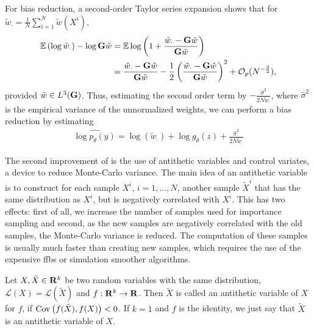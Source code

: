 For bias reduction, a second-order Taylor series expansion shows that for $\tilde{w}_\cdot = \frac{1}{N} \sum_{i =1}^N \tilde w(X^{i})$,
\begin{align*}
    \mathbb E \left(\log \tilde{w}_\cdot\right) - \log \mathbf G \tilde w &= \mathbb E \log \left(1 + \frac{\tilde{w}_\cdot - \mathbf G \tilde w}{\mathbf G \tilde w} \right)\\
                                                           &=  \frac{\tilde{w}_\cdot - \mathbf G \tilde w}{\mathbf G \tilde w}  - \frac{1}{2} \left(\frac{\tilde{w}_\cdot - \mathbf G \tilde w}{\mathbf G \tilde w} \right)^{2} + \mathcal O_{p}(N^{-\frac{3}{2}}),
\end{align*}
provided $\tilde w \in L^{3}(\mathbf G)$. Thus, estimating the second order term by $- \frac{\hat\sigma^2}{2N \tilde{w}_\cdot} $, where $\hat \sigma^{2}$ is the empirical variance of the unnormalized weights, we can perform a bias reduction by estimating 
\begin{align}
    \label{eq:loglik-hat-bias-reduction}
    \widehat{\log p_{\theta}(y)} = \log \left(\tilde w_{\cdot}\right) + \log g_{\theta}(z) + \frac{\hat\sigma^{2}}{2N\tilde w_{\cdot}}
\end{align}

The second improvement of \citep{Durbin1997Monte} is the use of antithetic variables and control variates, a device to reduce Monte-Carlo variance. The main idea of an antithetic variable is to construct for each sample $X^{i}$, $i = 1,\dots, N$, another sample $\tilde X^{i}$ that has the same distribution as $X^{i}$, but is negatively correlated with $X^{i}$. This has two effects: first of all, we increase the number of samples used for importance sampling and second, as the new samples are negatively correlated with the old samples, the Monte-Carlo variance is reduced. The computation of these samples is usually much faster than creating new samples, which requires the use of the expensive \acrshort{ffbs} or simulation smoother algorithms. 
\begin{definition}
    Let $X, \tilde X\in\mathbf R^{k}$ be two random variables with the same distribution, $\mathcal L (X) = \mathcal L(\tilde X)$ and $f: \mathbf R^{k} \to \mathbf R$. Then $\tilde X$ is called an antithetic variable of $X$ for $f$, if $\operatorname{Cov} \left( f(\tilde X), f(X) \right) < 0$. If $k = 1$ and $f$ is the identity, we just say that $\tilde X$ is an antithetic variable of $X$.
\end{definition}

